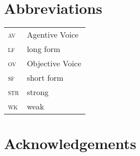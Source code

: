 \documentclass[output=paper
                ,modfonts
                ,nonflat
	        ,collection
	        ,collectionchapter
	        ,collectiontoclongg
 	        ,biblatex
                ,babelshorthands
                ,newtxmath
                ,draftmode
                ,colorlinks, citecolor=brown
]{./langsci/langscibook}
\begin{document}
\section*{Abbreviations}

\begin{tabularx}{.45\textwidth}{lX}
\textsc{av} & Agentive Voice\\
\textsc{lf} & long form\\ 
\textsc{ov} & Objective Voice\\
\textsc{sf} & short form\\
\textsc{str} & strong\\
\textsc{wk} & weak\\

\end{tabularx}

\section*{Acknowledgements}

{\sloppy
\printbibliography[heading=subbibliography,notkeyword=this] 
}
\end{document}
